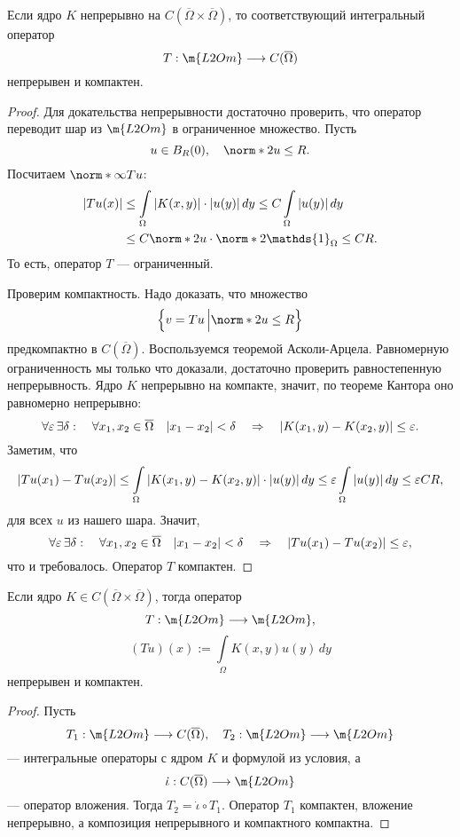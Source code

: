 \begin{theorem} Если ядро $K$ непрерывно на $C(\overline{\Omega} \times \overline{\Omega})$, то соответствующий интегральный оператор
$$ T: \m{L2Om} \longrightarrow C(\overline{\Omega}) $$
непрерывен и компактен.
\end{theorem}
\begin{proof} Для докательства непрерывности достаточно проверить, что оператор переводит шар из $\m{L2Om}$ в ограниченное множество. Пусть
$$ u \in B_R(0), \quad \norm*{2}{u} \leq R.$$
Посчитаем $\norm*{\infty}{Tu}$:
\begin{align*}
| Tu(x) | &\leq \int \limits_\Omega |K(x,y)| \cdot |u(y)| \, dy \leq C \int \limits_\Omega |u(y)| \, dy \\
& \leq C \norm*{2}{u} \cdot \norm*{2}{\mathds{1}_\Omega} \leq CR.
\end{align*}
То есть, оператор $T$ --- ограниченный.

Проверим компактность. Надо доказать, что множество
$$ \left\{ v = Tu \, \Big| \norm*{2}{u} \leq R \right\} $$ предкомпактно в $C(\overline{\Omega})$. Воспользуемся теоремой Асколи-Арцела. Равномерную ограниченность мы только что доказали, достаточно проверить равностепенную непрерывность. Ядро $K$ непрерывно на компакте, значит, по теореме Кантора оно равномерно непрерывно:
$$\forall \varepsilon \, \exists \delta: \quad \forall x_1, x_2 \in \overline{\Omega} \quad |x_1 - x_2| < \delta \quad \Rightarrow \quad |K(x_1,y) - K(x_2,y)| \leq \varepsilon.$$
Заметим, что
\begin{align*}
|Tu(x_1) - Tu(x_2)| \leq \int \limits_\Omega | K(x_1,y) - K(x_2,y)| \cdot |u(y)| \, dy \leq \varepsilon \int \limits_\Omega |u(y)| \, dy \leq \varepsilon CR,
\end{align*}
для всех $u$ из нашего шара. Значит,
$$ \forall \varepsilon \, \exists \delta : \quad \forall x_1, x_2 \in \overline{\Omega} \quad |x_1 - x_2| < \delta \quad \Rightarrow \quad |Tu(x_1) - Tu(x_2)| \leq \varepsilon,$$
что и требовалось. Оператор $T$ компактен.

\end{proof}

\begin{corollary} Если ядро $K \in C(\overline{\Omega} \times \overline{\Omega})$, тогда оператор
$$ T : \m{L2Om} \longrightarrow \m{L2Om},$$
$$(Tu)(x) := \int \limits_\Omega K(x,y) u(y) \, dy $$
непрерывен и компактен.
\end{corollary}
\begin{proof}
Пусть 
$$ T_1 : \m{L2Om} \longrightarrow C(\overline{\Omega}), \quad T_2 : \m{L2Om} \longrightarrow \m{L2Om}$$
--- интегральные операторы с ядром $K$ и формулой из условия, а
$$ \dot{\iota} : C(\overline{\Omega}) \longrightarrow \m{L2Om}$$
--- оператор вложения. Тогда $T_2 = \dot{\iota} \circ T_1$. Оператор $T_1$ компактен, вложение непрерывно, а композиция непрерывного и компактного компактна.

\end{proof}

